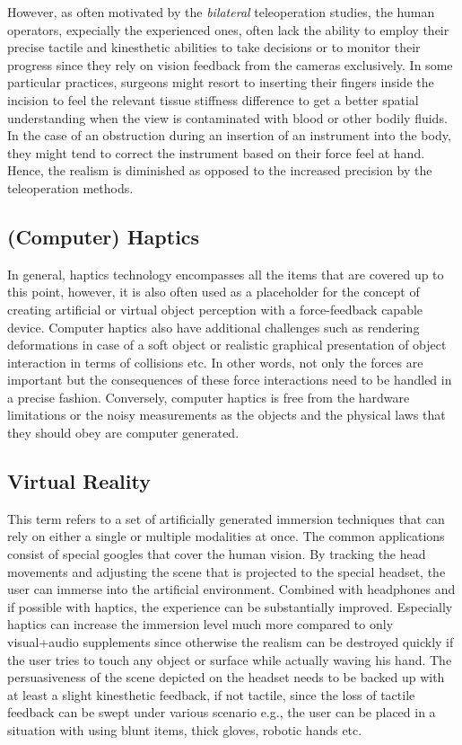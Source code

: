 However, as often motivated by the \emph{bilateral} teleoperation studies, the human operators, expecially the experienced ones, often lack the ability to employ their precise tactile and kinesthetic abilities to take decisions or to monitor their progress since they rely on vision feedback from the cameras exclusively. In some particular practices, surgeons might resort to inserting their fingers inside the incision to feel the relevant tissue stiffness difference to get a better spatial understanding when the view is contaminated with blood or other bodily fluids. In the case of an obstruction during an insertion of an instrument into the body, they might tend to correct the instrument based on their force feel at hand. Hence, the realism is diminished as opposed to the increased precision by the teleoperation methods. 

\subsection[Haptics]{(Computer) Haptics}
In general, haptics technology encompasses all the items that are covered up to this point, however, it is also often used as a placeholder for the concept of creating artificial or virtual object perception with a force-feedback capable device. Computer haptics also have additional challenges such as rendering deformations in case of a soft object or realistic graphical presentation of object interaction in terms of collisions etc. In other words, not only the forces are important but the consequences of these force interactions need to be handled in a precise fashion. Conversely, computer haptics is free from the hardware limitations or the noisy measurements as the objects and the physical laws that they should obey are computer generated. 


\subsection{Virtual Reality}

This term refers to a set of artificially generated immersion techniques that can rely on either a single or multiple modalities at once. The common applications consist of special googles that cover the human vision. By tracking the head movements and adjusting the scene that is projected to the special headset, the user can immerse into the artificial environment. Combined with headphones and if possible with haptics, the experience can be substantially improved. Especially haptics can increase the immersion level much more compared to only visual+audio supplements since otherwise the realism can be destroyed quickly if the user tries to touch any object or surface while actually waving his hand. The persuasiveness of the scene depicted on the headset needs to be backed up with at least a slight kinesthetic feedback, if not tactile, since the loss of tactile feedback can be swept under various scenario e.g., the user can be placed in a situation with using blunt items, thick gloves, robotic hands etc. 
